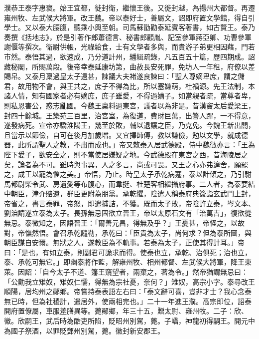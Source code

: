 \begin{pinyinscope}
 濮恭王泰字惠褒。始王宜都，徙封衛，繼懷王後。又徙封越，為揚州大都督。再遷雍州牧、左武候大將軍。改王魏。帝以泰好士，善屬文，詔即府置文學館，得自引學士。又以泰大腰腹，聽乘小輿至朝。司馬蘇勖勸泰延賓客著書，如古賢王。泰乃奏撰《括地志》，於是引著作郎蕭德言、秘書郎顧胤、記室參軍蔣亞卿、功曹參軍謝偃等撰次。衛尉供帳，光祿給食，士有文學者多與，而貴游子弟更相因藉，門若市然。泰悟其過，欲速成，乃分道計州，繙緝疏錄，凡五百五十篇，歷四期成。詔藏秘閣，所賜萬段。後帝幸泰延康坊第，曲赦長安死罪，免坊人一年租，府僚以差賜帛。又泰月稟過皇太子遠甚，諫議大夫褚遂良諫曰：「聖人尊嫡卑庶，謂之儲君，故用物不會，與王共之，庶子不得為比，所以塞嫌萌，杜禍源。先王法制，本諸人情，知有國家者必有嫡庶，庶子雖愛，不得過嫡子。如當親者疏，當尊者卑，則私恩害公，惑志亂國。今魏王稟料過東宮，議者以為非是。昔漢竇太后愛梁王，封四十餘城。王築苑三百里，治宮室，為復道，費財巨萬，出警人蹕，一不得意，遂發病死。宣帝亦驕淮陽王，幾至於敗，輔以退讓之臣，乃克免。今魏王新出閤，且當示以節儉，自可在後月加歲增。又宜擇師傅，教以謙儉，勉以文學，就成德器，此所謂聖人之教，不肅而成也。」帝又敕泰入居武德殿，侍中魏徵亦言：「王為陛下愛子，欲安全之，則不當使居嫌疑之地。今武德殿在東宮之西，昔海陵居之矣，論者為不可。雖時與事異，人之多言，尚或可畏。又王之心亦弗遑舍，願罷之，成王以寵為懼之美。」帝悟，乃止。時皇太子承乾病蹇，泰以計傾之，乃引駙馬都尉柴令武、房遺愛等布腹心，而韋挺、杜楚客相繼攝府事。二人者，為泰要結中朝臣，津介賂遺，群臣更附為朋黨。承乾懼，陰遣人稱泰府典簽詣玄武門上封，帝省之，書言泰罪，帝怒，即遣捕詰，不獲。既而太子敗，帝陰許立泰，岑文本、劉洎請遂立泰為太子。長孫無忌固欲立晉王，帝以太原石文有「治萬吉」，復欲從無忌。泰微知之，因語晉王：「爾善元昌，得無及乎？」王憂甚，帝怪之，以故對，帝憮然悟。會召承乾譴勒，承乾曰：「臣貴為太子，尚何求？但為泰所圖，與朝臣謀自安爾。無狀之人，遂教臣為不軌事。若泰為太子，正使其得計耳。」帝曰：「是也，有如立泰，則副君可詭求而得。使泰也立，承乾、治俱死；治也立，泰、承乾可無它。」即幽泰將作監，解雍州牧、相州都督、左武候大將軍，降王東萊。因詔：「自今太子不道、籓王窺望者，兩棄之，著為令。」然帝猶謂無忌曰：「公勸我立雉奴，雉奴仁懦，得無為宗社憂，奈何？」雉奴，高宗小字。泰尋改王順陽，居均州之鄖鄉。帝嘗持泰表語左右曰：「泰文辭可喜，豈非才士？我心念泰無已時，但為社稷計，遣居外，使兩相完也。」二十一年進王濮。高宗即位，詔泰開府置僚屬，車服羞膳異等。薨鄖鄉，年三十五，贈太尉、雍州牧。二子：欣、徽。欣嗣王，武后時為酷吏所陷，貶昭州別駕，薨。子嶠，神龍初得嗣王。開元中為國子祭酒，以罪貶鄧州別駕，薨。徽封新安郡王。




\end{pinyinscope}
